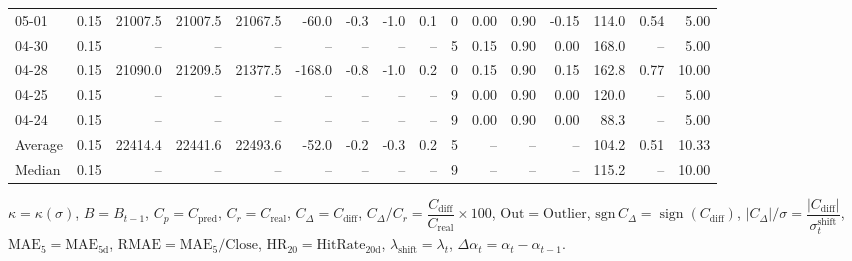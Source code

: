 \begin{threeparttable}
{\begin{tabular}{lrrrrrrrrrrrrrrr}
  05-01 &     0.15 & 21007.5 & 21007.5 & 21067.5 &      -60.0 &           -0.3 &                     -1.0 &                 0.1 &              0 &       0.00 &      0.90 &          -0.15 &            114.0 &            0.54 &                   5.00 \\
  04-30 &     0.15 &      -- &      -- &      -- &         -- &             -- &                       -- &                  -- &              5 &       0.15 &      0.90 &           0.00 &            168.0 &              -- &                   5.00 \\
  04-28 &     0.15 & 21090.0 & 21209.5 & 21377.5 &     -168.0 &           -0.8 &                     -1.0 &                 0.2 &              0 &       0.15 &      0.90 &           0.15 &            162.8 &            0.77 &                  10.00 \\
  04-25 &     0.15 &      -- &      -- &      -- &         -- &             -- &                       -- &                  -- &              9 &       0.00 &      0.90 &           0.00 &            120.0 &              -- &                   5.00 \\
  04-24 &     0.15 &      -- &      -- &      -- &         -- &             -- &                       -- &                  -- &              9 &       0.00 &      0.90 &           0.00 &             88.3 &              -- &                   5.00 \\
Average &     0.15 & 22414.4 & 22441.6 & 22493.6 &      -52.0 &           -0.2 &                     -0.3 &                 0.2 &              5 &         -- &        -- &             -- &            104.2 &            0.51 &                  10.33 \\
 Median &     0.15 &      -- &      -- &      -- &         -- &             -- &                       -- &                  -- &              9 &         -- &        -- &             -- &            115.2 &              -- &                  10.00 \\
\bottomrule
\end{tabular}
}
\begin{tablenotes}\footnotesize
\item $\kappa=\kappa(\sigma)$, $B=B_{t-1}$, $C_p=C_{\text{pred}}$, $C_r=C_{\text{real}}$, $C_\Delta=C_{\text{diff}}$, $C_\Delta/C_r=\dfrac{C_{\text{diff}}}{C_{\text{real}}}\times100$, $\mathrm{Out}=\text{Outlier}$, $\mathrm{sgn}\,C_\Delta=\operatorname{sign}(C_{\text{diff}})$, $|C_\Delta|/\sigma=\dfrac{|C_{\text{diff}}|}{\sigma_t^{\text{shift}}}$, $\mathrm{MAE}_5=\mathrm{MAE}_{5\text{d}}$, $\mathrm{RMAE}= \mathrm{MAE}_5 / \text{Close}$, $\mathrm{HR}_{20}=\mathrm{HitRate}_{20\text{d}}$, 
$\lambda_{\text{shift}}=\lambda_t$, 
$\Delta\alpha_t=\alpha_t-\alpha_{t-1}$.
\end{tablenotes}
\end{threeparttable}
\endgroup

